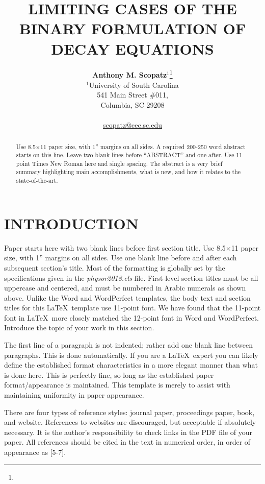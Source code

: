 \documentclass[letterpaper]{physor2018}
\title{LIMITING CASES OF THE BINARY FORMULATION OF DECAY EQUATIONS}
\author{%
  \textbf{Anthony M. Scopatz$^1$}\footnote{}\\
  $^1$University of South Carolina \\
  541 Main Street \#011, \\
  Columbia, SC 29208 \\
  \\
  \url{scopatz@cec.sc.edu}
}
\begin{document}
\maketitle
\justify

\begin{abstract}
  Use 8.5$\times$11 paper size, with 1'' margins on all sides.  A required 200-250
  word abstract starts on this line.  Leave two blank lines before ``ABSTRACT''
  and one after.  Use 11 point Times New Roman here and single
  spacing. The abstract is a very brief summary highlighting main
  accomplishments, what is new, and how it relates to the state-of-the-art.
\end{abstract}

\section{INTRODUCTION}
Paper starts here with two blank lines before first section title.  Use
8.5$\times$11 paper size, with 1'' margins on all sides.  Use one blank line
before and after each subsequent section’s title.  Most of the formatting is globally
set by the specifications given in the \emph{physor2018.cls} file.
First-level section titles must be all uppercase and centered, and must
be numbered in Arabic numerals as shown above.  Unlike the Word and WordPerfect
templates, the body text and section titles for this \LaTeX\ template use
11-point font.  We have found that the 11-point font in \LaTeX\ more closely
matched the 12-point font in Word and WordPerfect.  Introduce the topic of your work
in this section.

The first line of a paragraph is not indented; rather add one blank line between
paragraphs.  This is done automatically. If you are a \LaTeX\ expert you
can likely define the established format characteristics in a more elegant
manner than what is done here.  This is perfectly fine, so long as the
established paper format/appearance is maintained.  This template is merely
to assist with maintaining uniformity in paper appearance.

There are four types of reference styles: journal paper\cite{journal},
proceedings paper\cite{proc_paper}, book\cite{book}, and website\cite{website}.
References to websites are discouraged, but acceptable if absolutely necessary. It
is the author’s responsibility to check links in the PDF file of your paper.
All references should be cited in the text in numerical order, in order of
appearance as [5-7].
\end{document}

